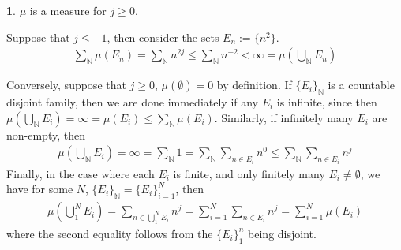 \documentclass[10.5pt]{article}
\theoremstyle{definition}
\newtheorem{pb}{}
\newcommand{\set}[1]{\{#1\}}
\begin{document}
	\begin{pb}
		\(\mu\) is a measure for \(j \geq 0\).

		Suppose that \(j \leq -1\), then consider the sets \(E_n := \set{n^2}\).
        \begin{align*}\sum_\mathbb{N} \mu(E_n) = \sum_\mathbb{N} n^{2j} \leq \sum_\mathbb{N} n^{-2} < \infty = \mu\left(\bigcup_\mathbb{N} E_n\right)\end{align*}

        Conversely, suppose that \(j \geq 0\), \(\mu(\emptyset) = 0\) by definition. If \(\set{E_i}_\mathbb{N}\) is a countable disjoint family,
        then we are done immediately if any \(E_i\) is infinite, since then \(\mu\left(\bigcup_\mathbb{N}E_i\right) = \infty = \mu(E_i) \leq \sum_\mathbb{N} \mu(E_i)\).
        Similarly, if infinitely many \(E_i\) are non-empty, then
        \begin{align*}
           \mu\left(\bigcup_\mathbb{N}E_i\right) = \infty = \sum_\mathbb{N} 1 = \sum_{\mathbb{N}} \sum_{n \in E_i} n^0 \leq \sum_{\mathbb{N}} \sum_{n \in E_i} n^j
        \end{align*}
        Finally, in the case where each \(E_i \) is finite, and only finitely many \(E_i \neq \emptyset\), we have for some \(N\), \(\set{E_i}_\mathbb{N} = \set{E_i}_{i=1}^N\), then
        \begin{align*}
            \mu\left(\bigcup_1^N E_i\right) = \sum_{n \in \bigcup_1^N E_i} n^j = \sum_{i =1}^N \sum_{n\in E_i} n^j = \sum_{i=1}^N \mu(E_i)
        \end{align*}
        where the second equality follows from the \(\set{E_i}_1^n\) being disjoint.
	\end{pb}
\end{document}
